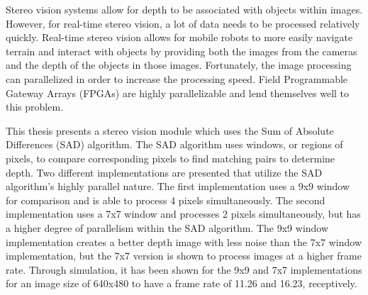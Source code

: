 Stereo vision systems allow for depth to be associated with objects within images. However, for real-time stereo vision, a lot of data needs to be processed relatively quickly. Real-time stereo vision allows for mobile robots to more easily navigate terrain and interact with objects by providing both the images from the cameras and the depth of the objects in those images. Fortunately, the image processing can parallelized in order to increase the processing speed. Field Programmable Gateway Arrays (FPGAs) are highly parallelizable and lend themselves well to this problem.

This thesis presents a stereo vision module which uses the Sum of Absolute Differences (SAD) algorithm. The SAD algorithm uses windows, or regions of pixels, to compare corresponding pixels to find matching pairs to determine depth. Two different implementations are presented that utilize the SAD algorithm's highly parallel nature. The first implementation uses a 9x9 window for comparison and is able to process 4 pixels simultaneously. The second implementation uses a 7x7 window and processes 2 pixels simultaneously, but has a higher degree of parallelism within the SAD algorithm. The 9x9 window implementation creates a better depth image with less noise than the 7x7 window implementation, but the 7x7 version is shown to process images at a higher frame rate. Through simulation, it has been shown for the 9x9 and 7x7 implementations for an image size of 640x480 to have a frame rate of 11.26 and 16.23, receptively.
